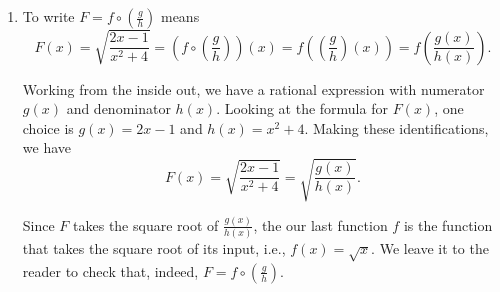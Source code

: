 \documentclass{ximera}
\begin{document}
\begin{example}
\begin{explanation}
\begin{enumerate}
\begin{enumerate}
\item  We attack deconstructing $G$ from an operational approach.  Given an input $t$, the first step is to square $t$, then add $1$, then divide the result into $2$.  We will assign each of these steps a function so as to write $G$ as a composite of \textit{three} functions: $f$, $g$ and $h$.  Our first function, $f$, is the function that squares its input, $f(t) = t^2$.  The next function is the function that adds $1$ to its input, $g(t) = t+1$.  Our last function takes its input and divides it into $2$, $h(t) = \frac{2}{t}$.  The claim is that $G = h \circ g \circ f$ which checks:  \[(h \circ g \circ f)(t) = h(g(f(t))) = h(g\left(t^2\right)) = h\left(t^2+1\right)= \frac{2}{t^2+1} = G(x).\] 

\item  If we look $H(s) = \frac{\sqrt{s}+1}{\sqrt{s}-1}$ with an eye towards building a complicated function from simpler functions, we see the expression $\sqrt{s}$ is a simple piece of the larger function.  If we define $f(s) = \sqrt{s}$, we have $H(s) = \frac{f(s)+1}{f(s)-1}$.  If we want to decompose $H = g \circ f$, then we can glean the formula for $g(s)$ by looking at what is being done to $f(s)$.  We take $g(s) = \frac{s+1}{s-1}$, and check below:  \[(g \circ f)(s) = g(f(s)) = \frac{f(s)+1}{f(s)-1} = \frac{\sqrt{s}+1}{\sqrt{s}-1} = H(s).\]  

\end{enumerate}

\item To write $F = f \circ \left(\frac{g}{h} \right)$ means \[F(x) =  \sqrt{\frac{2x-1}{x^2+4}} = \left( f \circ \left(\frac{g}{h} \right) \right)(x) = f \left(  \left(\frac{g}{h} \right)(x) \right) = f \left( \frac{g(x)}{h(x)} \right).\]

Working from the inside out, we have a rational expression with  numerator $g(x)$ and denominator $h(x)$.  Looking at the formula for $F(x)$, one choice is $g(x) = 2x-1$ and $h(x) = x^2+4$. Making these identifications, we have  \[ F(x) = \sqrt{\frac{2x-1}{x^2+4}} = \sqrt{\frac{g(x)}{h(x)}}.\]

Since $F$ takes the square root of $\frac{g(x)}{h(x)}$, the our last function $f$ is the function that takes the square root of its input, i.e.,  $f(x) = \sqrt{x}$.  We leave it to the reader to check that, indeed, $F = f \circ \left(\frac{g}{h} \right)$.

\end{enumerate}
\end{explanation}

\end{example}
\end{document}
